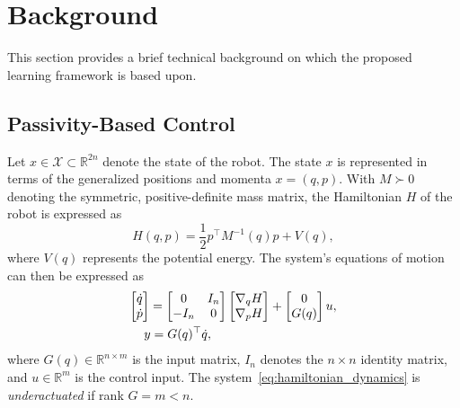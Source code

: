 \section{Background}

This section provides a brief technical background on which the proposed
learning framework is based upon. 

\subsection{Passivity-Based Control}
\label{ssec:pbc}

Let $x \in \mathcal{X} \subset \mathbb{R}^{2n}$ denote the state of the robot.
%
The state $x$ is represented in terms of the generalized positions and momenta
$x = (q, p)$. 
%
With $M \succ 0$ denoting the symmetric, positive-definite mass matrix, the Hamiltonian
$H$ of the robot is expressed as 
%
\begin{equation}
    H(q,p) = \frac{1}{2} p^\top M^{-1}(q) p + V(q),
    \label{eq:system_hamiltonian}
\end{equation}
%
where $V(q)$ represents the potential energy. The system's equations of motion
can then be expressed as 
%
\begin{align}
    \begin{split}  
      \bmat{\dot{q} \\ \dot{p}} &= \bmat{0 & I_n \\ -I_n & 0}\bmat{\nabla_qH \\
      \nabla_pH} + \bmat{0 \\ G(q)}u, \\
      &\hspace{-0.15cm} y = G(q)^\top \dot{q},
    \end{split}
    \label{eq:hamiltonian_dynamics}
\end{align}
%
where $G(q) \in \mathbb{R}^{n \times m}$ is the input matrix, $I_n$ denotes the
$n \times n$ identity matrix, and $u \in \mathbb{R}^m$ is
the control input.
%
The system~\eqref{eq:hamiltonian_dynamics} is \textit{underactuated} if rank $G
= m < n$.



